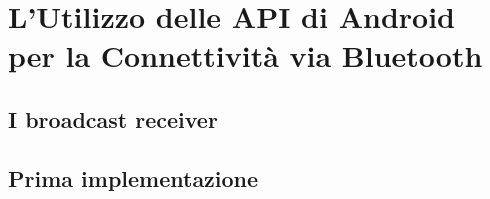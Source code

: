 \chapter{L'Utilizzo delle API di Android per la Connettività via Bluetooth}
\section{I broadcast receiver}
\section{Prima implementazione}